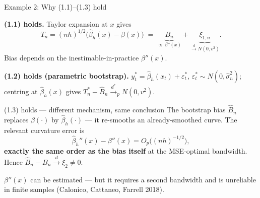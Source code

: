 \documentclass[10pt,aspectratio=169]{beamer}
\theoremstyle{plain}
\newcommand{\dto}{\xrightarrow{d}}
\newcommand{\dstarto}{\xrightarrow{d^{*}}}
\newcommand{\Tn}{T_{n}}
\newcommand{\Tns}{T_{n}^{*}}
\newcommand{\Bn}{B_{n}}
\newcommand{\Bnh}{\hat{B}_{n}}
\begin{document}

\begin{frame}{Example 2: Why (1.1)--(1.3) hold}

  \textbf{(1.1) holds.} Taylor expansion at $x$ gives
  \[
    \Tn = (nh)^{1/2}\bigl(\hat\beta_h(x) - \beta(x)\bigr)
        \;=\; \underbrace{\Bn}_{\propto\,\beta''(x)}
        + \underbrace{\xi_{1,n}}_{\dto N(0,v^2)}.
  \]
  Bias depends on the \alert{inestimable-in-practice} $\beta''(x)$.

  \medskip

  \textbf{(1.2) holds (parametric bootstrap).}
  $y_t^* = \hat\beta_h(x_t) + \varepsilon_t^*$, $\varepsilon_t^* \sim N(0,\hat\sigma_n^2)$;
  centring at $\hat\beta_h(x)$ gives $\Tns - \Bnh \dstarto_p N(0,v^2)$.

  \medskip

  \begin{alertblock}{(1.3) holds --- different mechanism, same conclusion}
    The bootstrap bias $\Bnh$ replaces $\beta(\cdot)$ by $\hat\beta_h(\cdot)$ ---
    it \alert{re-smooths an already-smoothed curve}. The relevant curvature
    error is
    \[
      \hat\beta_h''(x) - \beta''(x) = O_p\bigl((nh)^{-1/2}\bigr),
    \]
    \textbf{exactly the same order as the bias itself} at the MSE-optimal
    bandwidth. Hence $\Bnh - \Bn \dto \xi_2 \neq 0$.
  \end{alertblock}

  \footnotesize
  $\beta''(x)$ can be estimated --- but it requires a second bandwidth and is
  unreliable in finite samples (Calonico, Cattaneo, Farrell 2018).

\end{frame}

\end{document}
